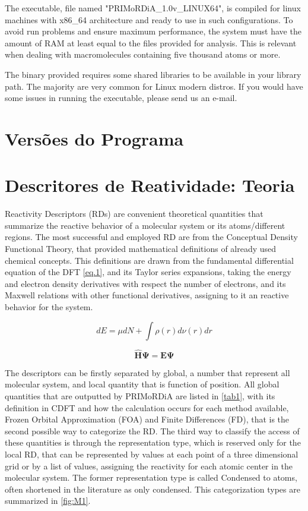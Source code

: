 \documentclass[a4paper,11pt]{refart}
\begin{document}
The executable, file named "PRIMoRDiA\_1.0v\_LINUX64", is compiled for linux machines with x86\_64 architecture and ready to use in such configurations. 
To avoid run problems and ensure maximum performance, the system must have the amount of RAM at least equal to the files provided for analysis. This is relevant when dealing with macromolecules containing five thousand atoms or more. 

The binary provided requires some shared libraries to be available in your library path. The majority are very common for Linux modern distros. If you would have some issues in running the executable, please send us an e-mail.

\section{Versões do Programa}

\section{Descritores de Reatividade: Teoria}

Reactivity Descriptors (RDs) are convenient theoretical quantities that summarize the reactive behavior of a molecular system or its atoms/different regions. The most successful and employed RD are from the Conceptual Density Functional Theory, that provided mathematical definitions of already used chemical concepts\cite{geerlings2003conceptual}. This definitions are drawn from the fundamental differential equation of the DFT \autoref{eq.1}, and its Taylor series expansions, taking the energy and electron density derivatives with respect the number of electrons, and its Maxwell relations with other functional derivatives, assigning to it an reactive behavior for the system\cite{parr1978elect}. 

\begin{equation}
dE = \mu dN + \int \rho(r) d \nu (r) dr
\label{eq.1}
\end{equation}

\begin{equation}
\mathbf{\hat{H}\Psi= E\Psi}
\label{eq.1000}
\end{equation}


The descriptors can be firstly separated by global, a number that represent all molecular system, and local quantity that is function of position. All global quantities that are outputted by PRIMoRDiA are listed in \autoref{tab1}, with its definition in CDFT and how the calculation occurs for each method available, Frozen Orbital Approximation (FOA) and Finite Differences (FD), that is the second possible way to categorize the RD. The third way to classify the access of these quantities is through the representation type, which is reserved only for the local RD, that can be represented by values at each point of a three dimensional grid or by a list of values, assigning the reactivity for each atomic center in the molecular system. The former representation type is called Condensed to atoms, often shortened in the literature as only condensed. This categorization types are summarized in \autoref{fig:M1}.
\end{document}
